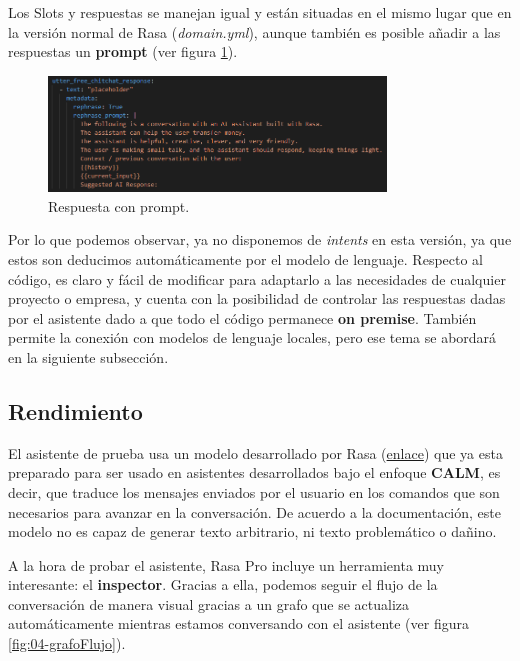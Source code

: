 \documentclass[a4paper,11pt]{article}
\begin{document}
			Los Slots y respuestas se manejan igual y están situadas en el mismo lugar que en la versión normal de Rasa (\textit{domain.yml}), aunque también es posible añadir a las respuestas un \textbf{prompt} (ver figura \ref{fig:03-respuestaPrompt}).
			
			\begin{figure}[H]
				\centering
				\includegraphics[width=0.8\textwidth]{img/04-respuestaPrompt.png}
				\caption{Respuesta con prompt.}		
				\label{fig:03-respuestaPrompt}
			\end{figure}
			
			Por lo que podemos observar, ya no disponemos de \textit{intents} en esta versión, ya que estos son deducimos automáticamente por el modelo de lenguaje. Respecto al código, es claro y fácil de modificar para adaptarlo  a las necesidades de cualquier proyecto o empresa, y cuenta con la posibilidad de controlar las respuestas dadas por el asistente dado a que todo el código permanece \textbf{on premise}. También permite la conexión con modelos de lenguaje locales, pero ese tema se abordará en la siguiente subsección.
		
		\subsection{Rendimiento}
		
			El asistente de prueba usa un modelo desarrollado por Rasa (\textcolor{blue}{\href{https://huggingface.co/rasa/cmd_gen_codellama_13b_calm_demo}{enlace}}) \cite{02_codellama} que ya esta preparado para ser usado en asistentes desarrollados bajo el enfoque \textbf{CALM}, es decir, que traduce los mensajes enviados por el usuario en los comandos que son necesarios para avanzar en la conversación. De acuerdo a la documentación, este modelo no es capaz de generar texto arbitrario, ni texto problemático o dañino.
			
			A la hora de probar el asistente, Rasa Pro incluye un herramienta muy interesante: el \textbf{inspector}. Gracias a ella, podemos seguir el flujo de la conversación de manera visual gracias a un grafo que se actualiza automáticamente mientras estamos conversando con el asistente (ver figura \ref{fig:04-grafoFlujo}).
			
\end{document}
